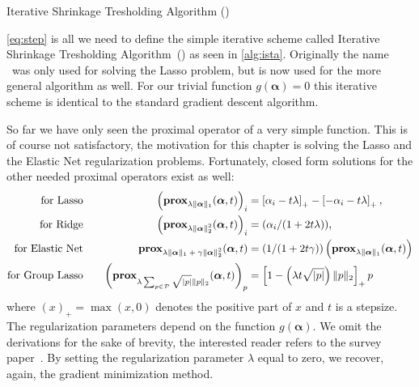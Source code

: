 \begin{algorithm}
 \caption{Iterative Shrinkage Tresholding Algorithm (\ista)~\cite{fista}}\label{alg:ista} 
 \begin{algorithmic}[1]
    \Statex
     
      \EndWhile
     \State \Return{\(\bm{\alpha}\)}
    \EndFunction
\end{algorithmic}
\end{algorithm}

\autoref{eq:step} is all we need to define the simple iterative scheme called
Iterative Shrinkage Tresholding Algorithm~(\ista) as seen in \autoref{alg:ista}.
Originally the name \ista\ was only used for solving the Lasso problem, but is now used for the more general algorithm as well. 
For our trivial function \(g(\bm{\alpha}) = 0\) this iterative scheme is identical to the standard gradient descent algorithm.

So far we have only seen the proximal operator of a very simple function.
This is of course not satisfactory, the motivation for this chapter is solving the Lasso and the Elastic Net regularization problems.
Fortunately, closed form solutions for the other needed proximal operators exist as well:
\begin{align}
\label{eq:prox-lasso}
\text{for Lasso} \quad &&
    \left( \prox[\(\lambda \Vert \bm{\alpha} \Vert_1\)]{\bm{\alpha}}{t} \right)_i &= \left[\alpha_i - t \lambda \right]_+
    - \left[ -\alpha_i - t \lambda \right]_+, \\
\text{for Ridge} \quad &&
                          \left(  \prox[\( \lambda \Vert \bm{\alpha} \Vert_2^2\)]{\bm{\alpha}}{t} \right)_i &= (\alpha_i/(1 + 2t \lambda)), \\
  \text{for Elastic Net} \quad && \prox[\( \lambda \Vert \bm{\alpha} \Vert_1 + \gamma \Vert \bm{\alpha} \Vert_2^2\)]{\bm{\alpha}}{t} &=
                                                                                                                                       \left( 1/(1 + 2 t \gamma) \right) \left(\prox[\(\lambda \Vert \bm{\alpha} \Vert_1\)]{\bm{\alpha}}{t}\right)\\
  \text{for Group Lasso} \quad && {\left(\prox[\( \lambda \sum_{p \in \mathcal{P}} \sqrt{\vert p \vert} \Vert p \Vert_2 \)]{\bm{\alpha}}{t} \right)}_p &=
                                                                                     \left[ 1 - \left(\lambda t \sqrt{\vert p \vert}\right) \Vert p \Vert_2 \right]_+ p
\end{align}
where \( \left( x \right)_+ = \max(x, 0) \) denotes the positive part of \(x\)
and \(t\) is a stepsize.
The regularization parameters depend on the function \(g(\bm{\alpha})\).
We omit the derivations for the sake of brevity, the interested reader refers to the survey paper~\cite{proxsurvey}.
By setting the regularization parameter \(\lambda\) equal to zero, we recover, again, the gradient minimization method.

